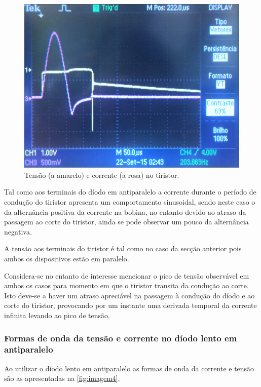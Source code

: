 \documentclass[a4paper,11pt]{article}
\numberwithin{equation}{section}
\begin{document}
\begin{figure}[h]
	\centering
	\includegraphics[keepaspectratio=true, scale=0.165]{img/imagem3}
	\caption{Tensão (a amarelo) e corrente (a rosa) no tiristor.}
	\label{fig:imagem3}
	\vspace{-0.8em}
\end{figure}


Tal como aos terminais do díodo em antiparalelo a corrente durante o período de condução do tiristor apresenta um comportamento sinusoidal, sendo neste caso o da alternância positiva da corrente na bobina, no entanto devido ao atraso da passagem ao corte do tiristor, ainda se pode observar um pouco da alternância negativa.

A tensão aos terminais do tiristor é tal como no caso da secção anterior pois ambos os dispositivos estão em paralelo.

Considera-se no entanto de interesse mencionar o pico de tensão observável em ambos os casos para momento em que o tiristor transita da condução ao corte. Isto deve-se a haver um atraso apreciável na passagem à condução do díodo e ao corte do tiristor, provocando por um instante uma derivada temporal da corrente infinita levando ao pico de tensão.


\subsubsection{Formas de onda da tensão e corrente no díodo lento em antiparalelo}

Ao utilizar o díodo lento em antiparalelo as formas de onda da corrente e tensão são as apresentadas na \autoref{fig:imagem4}.
\end{document}

